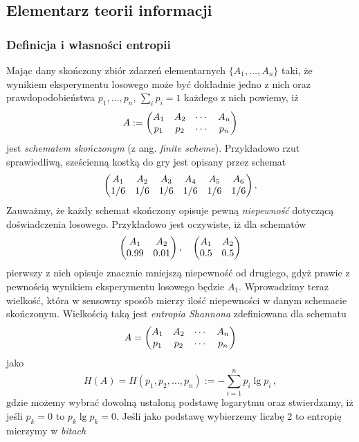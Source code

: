 \documentclass{myclass}
\begin{document}
\subsection{Elementarz teorii informacji}

\subsubsection{Definicja i własności entropii}

Mając dany skończony zbiór zdarzeń elementarnych \(\{A_1,\ldots,A_n\}\) taki, że wynikiem
eksperymentu losowego może być dokładnie jedno z nich oraz prawdopodobieństwa \(p_1,\ldots,p_n\),
\(\sum_{i}p_i = 1\) każdego z nich powiemy, iż
\begin{equation*}
    A := \mqty(A_1 & A_2 & \cdots & A_n \\ p_1 & p_2 & \cdots & p_n)
\end{equation*} 
jest \textit{schematem skończonym} (z ang. \textit{finite scheme}). Przykładowo rzut sprawiedliwą,
sześcienną kostką do gry jest opisany przez schemat
\begin{equation*}
    \mqty(A_1 & A_2 & A_3 & A_4 & A_5 & A_6 \\ 1/6 & 1/6 & 1/6 & 1/6 & 1/6 & 1/6) \,.
\end{equation*} 
Zauważmy, że każdy schemat skończony opisuje pewną \textit{niepewność} dotyczącą doświadczenia
losowego. Przykładowo jest oczywiste, iż dla schematów
\begin{equation*}
    \mqty(A_1 & A_2 \\ 0.99 & 0.01)\,,\quad \mqty(A_1 & A_2 \\ 0.5 & 0.5)
\end{equation*}
pierwszy z nich opisuje znacznie mniejszą niepewność od drugiego, gdyż prawie z pewnością wynikiem
eksperymentu losowego będzie \(A_1\). Wprowadzimy teraz wielkość, która w sensowny sposób mierzy
ilość niepewności w danym schemacie skończonym. Wielkością taką jest \textit{entropia Shannona}
zdefiniowana dla schematu
\begin{equation*}
    A = \mqty(A_1 & A_2 & \cdots & A_n \\ p_1 & p_2 & \cdots & p_n)
\end{equation*}
jako
\begin{equation*}
    H(A) = H(p_1,p_2,\ldots,p_n) := -\sum_{i=1}^n p_i\lg p_i\,,
\end{equation*}
gdzie możemy wybrać dowolną ustaloną podstawę logarytmu oraz stwierdzamy, iż jeśli \(p_k = 0\) to
\(p_k \lg p_k = 0\). Jeśli jako podstawę wybierzemy liczbę 2 to entropię mierzymy w \textit{bitach}
\end{document}
